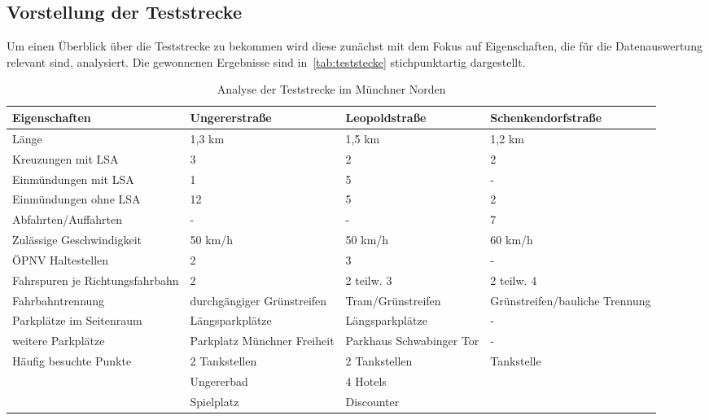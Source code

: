 \subsection{Vorstellung der Teststrecke}\label{subsechtion:Vorstellung der Teststrecke}
Um einen Überblick über die Teststrecke zu bekommen wird diese zunächst mit dem Fokus auf Eigenschaften, die für die Datenauswertung relevant sind, analysiert. Die gewonnenen Ergebnisse sind in~\autoref{tab:teststecke} stichpunktartig dargestellt. 

\begin{table}[htpb]
	\scriptsize
	\caption[Analyse der Teststrecke im Münchner Norden]{Analyse der Teststrecke im Münchner Norden}\label{tab:teststecke}
	\centering
	\begin{tabular}{l p{3cm} p{3cm} p{3cm}}
		\toprule
		Eigenschaften & Ungererstraße & Leopoldstraße & Schenkendorfstraße \\
		\midrule
		Länge & 1,3 km & 1,5 km & 1,2 km \\
		Kreuzungen mit LSA & 3 & 2 & 2 \\
		Einmündungen mit LSA & 1 & 5 & - \\
		Einmündungen ohne LSA & 12 & 5 & 2 \\
		Abfahrten/Auffahrten & - & - & 7 \\
		Zulässige Geschwindigkeit & 50 km/h & 50 km/h & 60 km/h \\%
		ÖPNV Haltestellen & 2 & 3 & - \\
		Fahrspuren je Richtungsfahrbahn & 2 & 2 teilw. 3 & 2 teilw. 4 \\
		Fahrbahntrennung & durchgängiger Grünstreifen & Tram/Grünstreifen & Grünstreifen/bauliche Trennung\\
		Parkplätze im Seitenraum & Längsparkplätze & Längsparkplätze & - \\
		weitere Parkplätze & Parkplatz Münchner Freiheit & Parkhaus Schwabinger Tor & - \\
		Häufig besuchte Punkte & 2 Tankstellen & 2 Tankstellen & Tankstelle\\
		& Ungererbad & 4 Hotels & \\
		& Spielplatz & Discounter & \\
		\bottomrule
	\end{tabular}
\end{table}

